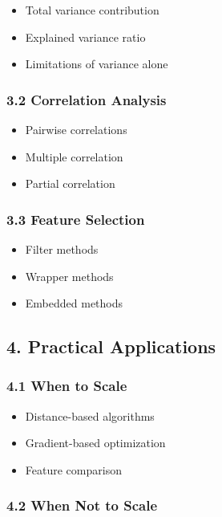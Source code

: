 \documentclass[11pt]{article}
\providecommand{\tightlist}{%
  \setlength{\itemsep}{0pt}\setlength{\parskip}{0pt}}
\begin{document}
\begin{itemize}
\tightlist
\item
  Total variance contribution
\item
  Explained variance ratio
\item
  Limitations of variance alone
\end{itemize}

\subsubsection{3.2 Correlation Analysis}\label{correlation-analysis}

\begin{itemize}
\tightlist
\item
  Pairwise correlations
\item
  Multiple correlation
\item
  Partial correlation
\end{itemize}

\subsubsection{3.3 Feature Selection}\label{feature-selection}

\begin{itemize}
\tightlist
\item
  Filter methods
\item
  Wrapper methods
\item
  Embedded methods
\end{itemize}

\subsection{4. Practical Applications}\label{practical-applications}

\subsubsection{4.1 When to Scale}\label{when-to-scale}

\begin{itemize}
\tightlist
\item
  Distance-based algorithms
\item
  Gradient-based optimization
\item
  Feature comparison
\end{itemize}

\subsubsection{4.2 When Not to Scale}\label{when-not-to-scale}
\end{document}

